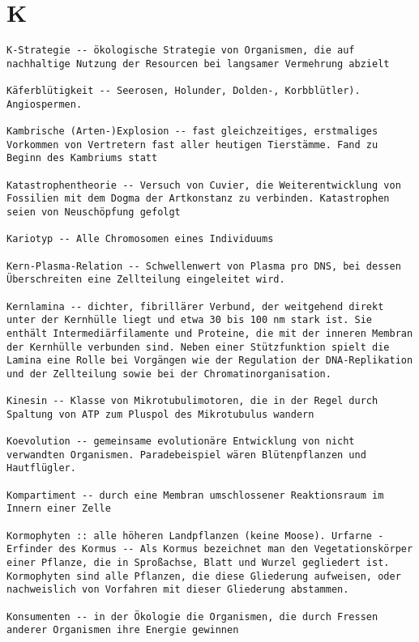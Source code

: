 \documentclass{article}
\begin{document}
\section{K}
\begin{verbatim}
K-Strategie -- ökologische Strategie von Organismen, die auf nachhaltige Nutzung der Resourcen bei langsamer Vermehrung abzielt

Käferblütigkeit -- Seerosen, Holunder, Dolden-, Korbblütler). Angiospermen.

Kambrische (Arten-)Explosion -- fast gleichzeitiges, erstmaliges Vorkommen von Vertretern fast aller heutigen Tierstämme. Fand zu Beginn des Kambriums statt

Katastrophentheorie -- Versuch von Cuvier, die Weiterentwicklung von Fossilien mit dem Dogma der Artkonstanz zu verbinden. Katastrophen seien von Neuschöpfung gefolgt

Kariotyp -- Alle Chromosomen eines Individuums

Kern-Plasma-Relation -- Schwellenwert von Plasma pro DNS, bei dessen Überschreiten eine Zellteilung eingeleitet wird.

Kernlamina -- dichter, fibrillärer Verbund, der weitgehend direkt unter der Kernhülle liegt und etwa 30 bis 100 nm stark ist. Sie enthält Intermediärfilamente und Proteine, die mit der inneren Membran der Kernhülle verbunden sind. Neben einer Stützfunktion spielt die Lamina eine Rolle bei Vorgängen wie der Regulation der DNA-Replikation und der Zellteilung sowie bei der Chromatinorganisation.

Kinesin -- Klasse von Mikrotubulimotoren, die in der Regel durch Spaltung von ATP zum Pluspol des Mikrotubulus wandern

Koevolution -- gemeinsame evolutionäre Entwicklung von nicht verwandten Organismen. Paradebeispiel wären Blütenpflanzen und Hautflügler.

Kompartiment -- durch eine Membran umschlossener Reaktionsraum im Innern einer Zelle

Kormophyten :: alle höheren Landpflanzen (keine Moose). Urfarne - Erfinder des Kormus -- Als Kormus bezeichnet man den Vegetationskörper einer Pflanze, die in Sproßachse, Blatt und Wurzel gegliedert ist. Kormophyten sind alle Pflanzen, die diese Gliederung aufweisen, oder nachweislich von Vorfahren mit dieser Gliederung abstammen.

Konsumenten -- in der Ökologie die Organismen, die durch Fressen anderer Organismen ihre Energie gewinnen


\end{verbatim}
\end{document}
